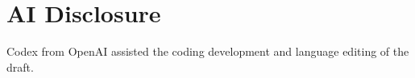 \documentclass[orivec]{llncs}
\begin{document}
\section*{AI Disclosure}
Codex from OpenAI assisted the coding development and language editing of the draft.



\end{document}
